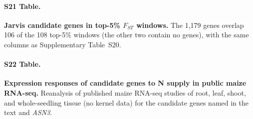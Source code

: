 \paragraph*{S21 Table.}
\makeatletter
\def\@currentlabelname{S21 Table}
\makeatother
\label{S21_Table}
\textbf{Jarvis candidate genes in top-5\% $F_{ST}$ windows.} The 1,179 genes overlap 106 of the 108 top-5\% windows (the other two contain no genes), with the same columns as Supplementary Table~S20.

\paragraph*{S22 Table.}
\makeatletter
\def\@currentlabelname{S22 Table}
\makeatother
\label{S22_Table}
\textbf{Expression responses of candidate genes to N supply in public maize RNA-seq.} Reanalysis of published maize RNA-seq studies of root, leaf, shoot, and whole-seedling tissue (no kernel data) for the candidate genes named in the text and \textit{ASN3}.


